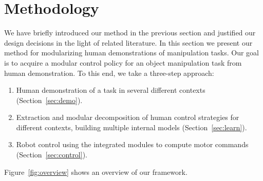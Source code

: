 \section{Methodology}
\label{sec:method}

We have briefly introduced our method in the previous section and
justified our design decisions in the light of related literature.  In
this section we present our method for modularizing human
demonstrations of manipulation tasks. Our goal is to acquire a modular
control policy for an object manipulation task from human
demonstration. To this end, we take a three-step approach:
\begin{enumerate}
\item Human demonstration of a task in several different contexts (Section~\ref{sec:demo}).
\item Extraction and modular decomposition of human control strategies
  for different contexts, building multiple internal models
  (Section~\ref{sec:learn}).
\item Robot control using the integrated modules to compute motor
  commands (Section~\ref{sec:control}).
\end{enumerate}
Figure~\ref{fig:overview} shows an overview of our framework.


